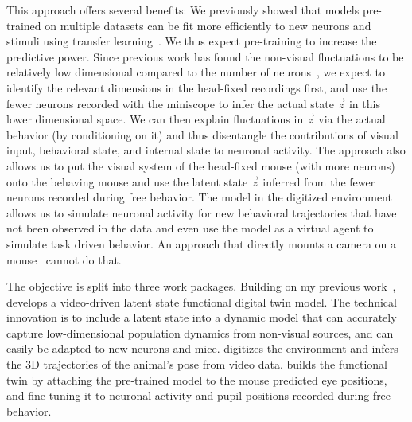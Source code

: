 \documentclass[B2,COG]{ercgrant}
\begin{document}
This approach offers several benefits:
     We previously showed that models pre-trained on multiple datasets can be fit more efficiently to new neurons and stimuli using transfer learning~\parencite{Lurz2020-ua}. We thus expect pre-training to increase the predictive power. 
     Since previous work has found the non-visual fluctuations to be relatively low dimensional compared to the number of neurons~\parencite{Stringer2019-lt}, we expect to identify the relevant dimensions in the head-fixed recordings first, and use the fewer neurons recorded with the miniscope to infer the actual state $\vec{z}$ in this lower dimensional space. We can then explain fluctuations in $\vec{z}$ via the actual behavior (by conditioning on it) and thus disentangle the contributions of visual input, behavioral state, and internal state to neuronal activity. 
     The approach also allows us to put the visual system of the head-fixed mouse (with more neurons) onto the behaving mouse and use the latent state $\vec{z}$ inferred from the fewer neurons recorded during free behavior. 
     The model in the digitized environment allows us to simulate neuronal activity for new behavioral trajectories that have not been observed in the data and even use the model as a virtual agent to simulate task driven behavior. An approach that directly mounts a camera on a mouse~\parencite{Parker2022-ac} cannot do that. 


The objective is split into three work packages. 
Building on my previous work~\parencite{Sinz2018-sk, Bashiri2021-or},  develops a video-driven latent state functional digital twin model. 
The technical innovation is to include a latent state into a dynamic model that can accurately capture low-dimensional population dynamics from non-visual sources, and can easily be adapted to new neurons and mice. 
 digitizes the environment and infers the 3D trajectories of the animal's pose from video data.
 builds the functional twin by attaching the pre-trained model to the mouse predicted eye positions, and fine-tuning it to neuronal activity and pupil positions recorded during free behavior.


\end{document}
